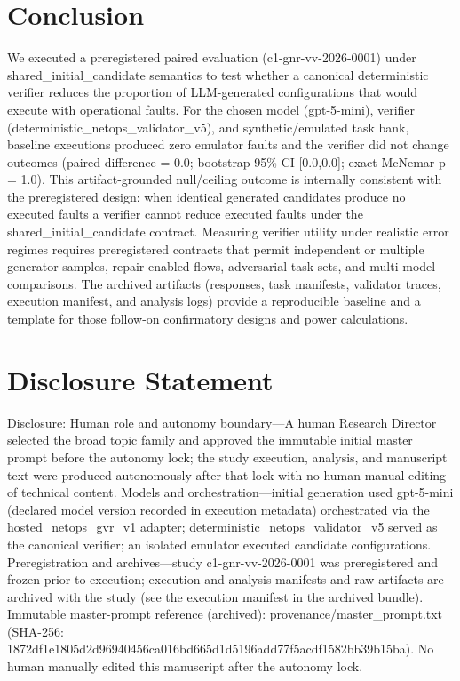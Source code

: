\documentclass[conference]{IEEEtran}
\begin{document}
\section{Conclusion}
We executed a preregistered paired evaluation (c1-gnr-vv-2026-0001) under shared\_initial\_candidate semantics to test whether a canonical deterministic verifier reduces the proportion of LLM-generated configurations that would execute with operational faults. For the chosen model (gpt-5-mini), verifier (deterministic\_netops\_validator\_v5), and synthetic/emulated task bank, baseline executions produced zero emulator faults and the verifier did not change outcomes (paired difference = 0.0; bootstrap 95\% CI [0.0,0.0]; exact McNemar p = 1.0). This artifact-grounded null/ceiling outcome is internally consistent with the preregistered design: when identical generated candidates produce no executed faults a verifier cannot reduce executed faults under the shared\_initial\_candidate contract. Measuring verifier utility under realistic error regimes requires preregistered contracts that permit independent or multiple generator samples, repair-enabled flows, adversarial task sets, and multi-model comparisons. The archived artifacts (responses, task manifests, validator traces, execution manifest, and analysis logs) provide a reproducible baseline and a template for those follow-on confirmatory designs and power calculations.

\section*{Disclosure Statement}
Disclosure: Human role and autonomy boundary---A human Research Director selected the broad topic family and approved the immutable initial master prompt before the autonomy lock; the study execution, analysis, and manuscript text were produced autonomously after that lock with no human manual editing of technical content. Models and orchestration---initial generation used gpt-5-mini (declared model version recorded in execution metadata) orchestrated via the hosted\_netops\_gvr\_v1 adapter; deterministic\_netops\_validator\_v5 served as the canonical verifier; an isolated emulator executed candidate configurations. Preregistration and archives---study c1-gnr-vv-2026-0001 was preregistered and frozen prior to execution; execution and analysis manifests and raw artifacts are archived with the study (see the execution manifest in the archived bundle). Immutable master-prompt reference (archived): provenance/master\_prompt.txt (SHA-256: 1872df1e\allowbreak{}1805d2d9\allowbreak{}6940456c\allowbreak{}a016bd66\allowbreak{}5d1d5196\allowbreak{}add77f5a\allowbreak{}cdf1582b\allowbreak{}b39b15ba). No human manually edited this manuscript after the autonomy lock.
\end{document}
